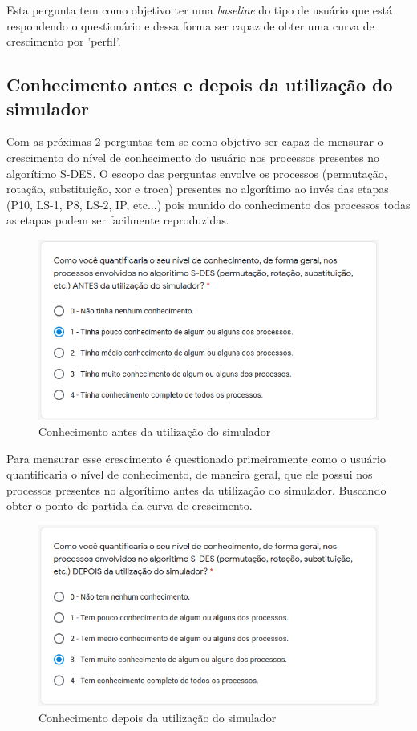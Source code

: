 Esta pergunta tem como objetivo ter uma \textit{baseline} do tipo de usuário que está respondendo o questionário e dessa forma ser capaz de obter uma curva de crescimento por 'perfil'.

\subsection{Conhecimento antes e depois da utilização do simulador}
Com as próximas 2 perguntas tem-se como objetivo ser capaz de mensurar o crescimento do nível de conhecimento do usuário nos processos presentes no algorítimo S-DES. O escopo das perguntas envolve os processos (permutação, rotação, substituição, xor e troca) presentes no algorítimo ao invés das etapas (P10, LS-1, P8, LS-2, IP, etc...) pois munido do conhecimento dos processos todas as etapas podem ser facilmente reproduzidas.

\begin{figure}[H]
    \centering
    \caption{Conhecimento antes da utilização do simulador}
    \includegraphics[width=0.75\linewidth]{Questionario/Q2.png}
\end{figure}

Para mensurar esse crescimento é questionado primeiramente como o usuário quantificaria o nível de conhecimento, de maneira geral, que ele possui nos processos presentes no algorítimo antes da utilização do simulador. Buscando obter o ponto de partida da curva de crescimento.

\begin{figure}[H]
    \centering
    \caption{Conhecimento depois da utilização do simulador}
    \includegraphics[width=0.75\linewidth]{Questionario/Q3.png}
\end{figure}

